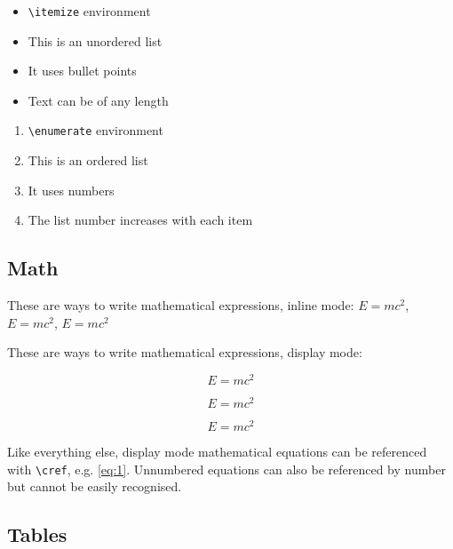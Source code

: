 \documentclass[12pt, letterpaper]{article} %
\begin{document}
\begin{itemize}
  \item \verb+\itemize+ environment
  \item This is an unordered list
  \item It uses bullet points
  \item Text can be of any length
\end{itemize}

\begin{enumerate}
  \item \verb+\enumerate+ environment
  \item This is an ordered list
  \item It uses numbers
  \item The list number increases with each item
\end{enumerate}

\subsection*{Math}

These are ways to write mathematical expressions, inline mode:
$E=mc^2$, 
\(E=mc^2\), 
\begin{math} E=mc^2 \end{math}

These are ways to write mathematical expressions, display mode:

\begin{equation} \label{eq:1} %
E=mc^2
\end{equation}

\[E=mc^2\] %

\begin{displaymath} %
E=mc^2
\end{displaymath}


Like everything else, display mode mathematical equations can be referenced 
with \verb+\cref+, e.g. \cref{eq:1}. Unnumbered equations can also be 
referenced by number but cannot be easily recognised.

\clearpage

\subsection*{Tables} %
\end{document}
